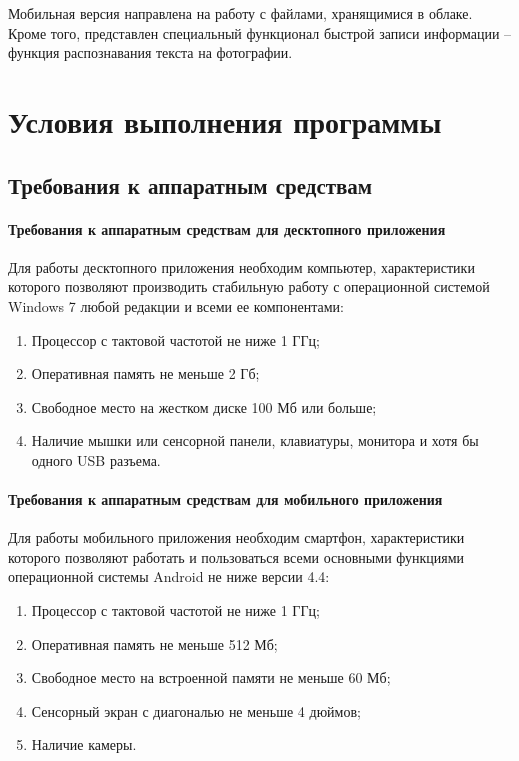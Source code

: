﻿\documentclass[opermanual]{espd}
\begin{document}
Мобильная версия направлена на работу с файлами, хранящимися в облаке. Кроме того, представлен специальный функционал быстрой записи информации -- функция распознавания текста на фотографии.

\section{Условия выполнения программы}

\subsection{Требования к аппаратным средствам}
\paragraph{Требования к аппаратным средствам для десктопного приложения}
Для работы десктопного приложения необходим компьютер, характеристики которого позволяют производить стабильную работу с операционной системой Windows 7 любой редакции и всеми ее компонентами:

\begin{enumerate}
\item Процессор с тактовой частотой не ниже 1 ГГц;
\item Оперативная память не меньше 2 Гб;
\item Свободное место на жестком диске 100 Мб или больше;
\item Наличие мышки или сенсорной панели, клавиатуры, монитора и хотя бы одного USB разъема.
\end{enumerate}

\paragraph{Требования к аппаратным средствам для мобильного приложения}
Для работы мобильного приложения необходим смартфон, характеристики которого позволяют работать и пользоваться всеми основными функциями операционной системы Android не ниже версии 4.4: 

\begin{enumerate}
\item Процессор с тактовой частотой не ниже 1 ГГц;
\item Оперативная память не меньше 512 Мб;
\item Свободное место на встроенной памяти не меньше 60 Мб;
\item Сенсорный экран с диагональю не меньше 4 дюймов;
\item Наличие камеры.
\end{enumerate}
\end{document}

